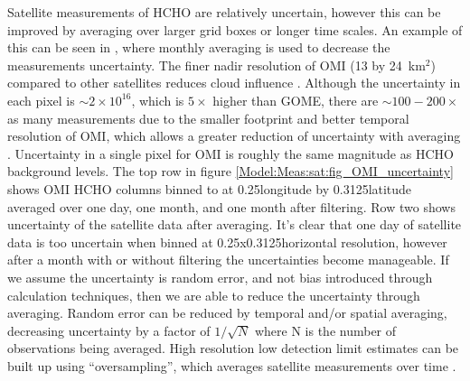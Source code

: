       Satellite measurements of HCHO are relatively uncertain, however this can be improved by averaging over larger grid boxes or longer time scales.
      An example of this can be seen in \textcite{Dufour2009}, where monthly averaging is used to decrease the measurements uncertainty.
      The finer nadir resolution of OMI (13 by 24~km${^2}$) compared to other satellites reduces cloud influence \parencite{Millet2006, Millet2008}.
      Although the uncertainty in each pixel is $\sim 2 \times 10^{16}$, which is $5 \times$ higher than GOME, there are $\sim 100-200 \times $ as many measurements due to the smaller footprint and better temporal resolution of OMI, which allows a greater reduction of uncertainty with averaging \parencite{Chance2002,Millet2008}.
      Uncertainty in a single pixel for OMI is roughly the same magnitude as HCHO background levels.
      The top row in figure \ref{Model:Meas:sat:fig_OMI_uncertainty} shows OMI HCHO columns binned to at 0.25\degr longitude by 0.3125\degr latitude averaged over one day, one month, and one month after filtering.
      Row two shows uncertainty of the satellite data after averaging.
      It's clear that one day of satellite data is too uncertain when binned at 0.25x0.3125\degr horizontal resolution, however after a month with or without filtering the uncertainties become manageable.
      If we assume the uncertainty is random error, and not bias introduced through calculation techniques, then we are able to reduce the uncertainty through averaging.
      Random error can be reduced by temporal and/or spatial averaging, decreasing uncertainty by a factor of $1/\sqrt{N}$ where N is the number of observations being averaged.
      High resolution low detection limit estimates can be built up using ``oversampling'', which averages satellite measurements over time \parencite[eg.][]{Zhu2014}.
      
